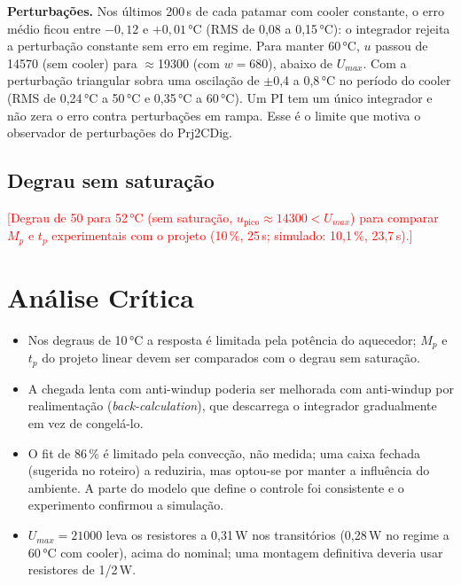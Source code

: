 \documentclass[a4paper]{ifacconf}
\newcommand{\pendente}[1]{\textcolor{red}{[#1]}}
\begin{document}
\textbf{Perturbações.} Nos últimos 200\,s de cada patamar com cooler constante, o erro médio ficou
entre $-0{,}12$ e $+0{,}01$\,°C (RMS de 0,08 a 0,15\,°C): o integrador rejeita a perturbação
constante sem erro em regime. Para manter 60\,°C, $u$ passou de 14570 (sem cooler) para
$\approx$19300 (com $w=680$), abaixo de $U_{max}$. Com a perturbação triangular sobra uma oscilação
de $\pm$0,4 a 0,8\,°C no período do cooler (RMS de 0,24\,°C a 50\,°C e 0,35\,°C a 60\,°C). Um PI
tem um único integrador e não zera o erro contra perturbações em rampa. Esse é o limite que motiva
o observador de perturbações do Prj2CDig.

\subsection{Degrau sem saturação}

\pendente{Degrau de 50 para 52\,°C (sem saturação, $u_{\text{pico}}\approx14300<U_{max}$) para
comparar $M_p$ e $t_p$ experimentais com o projeto (10\,\%, 25\,s; simulado: 10,1\,\%, 23,7\,s).}

\section{Análise Crítica}

\begin{itemize}
\item Nos degraus de 10\,°C a resposta é limitada pela potência do aquecedor; $M_p$ e $t_p$ do
projeto linear devem ser comparados com o degrau sem saturação.
\item A chegada lenta com anti-windup poderia ser melhorada com anti-windup por realimentação
(\emph{back-calculation}), que descarrega o integrador gradualmente em vez de congelá-lo.
\item O fit de 86\,\% é limitado pela convecção, não medida; uma caixa fechada (sugerida no
roteiro) a reduziria, mas optou-se por manter a influência do ambiente. A parte do modelo que
define o controle foi consistente e o experimento confirmou a simulação.
\item $U_{max}=21000$ leva os resistores a 0,31\,W nos transitórios (0,28\,W no regime a 60\,°C
com cooler), acima do nominal; uma montagem definitiva deveria usar resistores de 1/2\,W.
\end{itemize}

\end{document}
